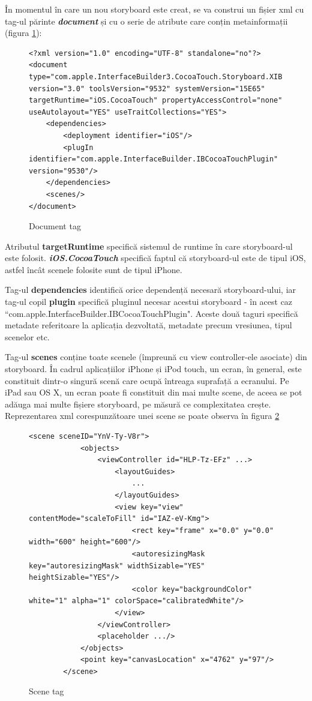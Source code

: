 În momentul în care un nou storyboard este creat, se va construi un fișier xml cu tag-ul părinte \textbf{\textit{document}} și cu o serie de atribute care conțin metainformații (figura \ref{fig:document}):

\begin{figure}[!htbp]
\lstset{language=XML}
\begin{lstlisting}
<?xml version="1.0" encoding="UTF-8" standalone="no"?>
<document type="com.apple.InterfaceBuilder3.CocoaTouch.Storyboard.XIB" version="3.0" toolsVersion="9532" systemVersion="15E65" targetRuntime="iOS.CocoaTouch" propertyAccessControl="none" useAutolayout="YES" useTraitCollections="YES">
    <dependencies>
        <deployment identifier="iOS"/>
        <plugIn identifier="com.apple.InterfaceBuilder.IBCocoaTouchPlugin" version="9530"/>
    </dependencies>
    <scenes/>
</document>
\end{lstlisting}
\caption{Document tag}\label{fig:document}
\end{figure}

Atributul \textbf{targetRuntime}  specifică sistemul de runtime în care storyboard-ul este folosit. \textbf{\textit{iOS.CocoaTouch}} specifică faptul că storyboard-ul este de tipul iOS, astfel încât scenele folosite sunt de tipul iPhone.

Tag-ul \textbf{dependencies} identifică orice dependență necesară storyboard-ului, iar tag-ul copil \textbf{plugin} specifică pluginul necesar acestui storyboard - în acest caz ``com.apple.InterfaceBuilder.IBCocoaTouchPlugin". Aceste două taguri specifică metadate referitoare la aplicația dezvoltată, metadate precum vresiunea, tipul scenelor etc.

Tag-ul \textbf{scenes} conține toate scenele (împreună cu view controller-ele asociate) din storyboard. 
În cadrul aplicațiilor iPhone și iPod touch, un ecran, în general, este constituit dintr-o singură scenă care ocupă întreaga suprafață a ecranului. Pe iPad sau OS X, un ecran poate fi constituit din mai multe scene, de aceea se pot adăuga mai multe fișiere storyboard, pe măsură ce complexitatea crește.
Reprezentarea xml corespunzătoare unei scene se poate observa în figura \ref{fig:scene}

\begin{figure}[!htbp]
\lstset{language=XML}
\begin{lstlisting}
<scene sceneID="YnV-Ty-V8r">
            <objects>
                <viewController id="HLP-Tz-EFz" ...>
                    <layoutGuides>
                        ...
                    </layoutGuides>
                    <view key="view" contentMode="scaleToFill" id="IAZ-eV-Kmg">
                        <rect key="frame" x="0.0" y="0.0" width="600" height="600"/>
                        <autoresizingMask key="autoresizingMask" widthSizable="YES" heightSizable="YES"/>
                        <color key="backgroundColor" white="1" alpha="1" colorSpace="calibratedWhite"/>
                    </view>
                </viewController>
                <placeholder .../>
            </objects>
            <point key="canvasLocation" x="4762" y="97"/>
        </scene>
\end{lstlisting}
\caption{Scene tag}\label{fig:scene}
\end{figure}

